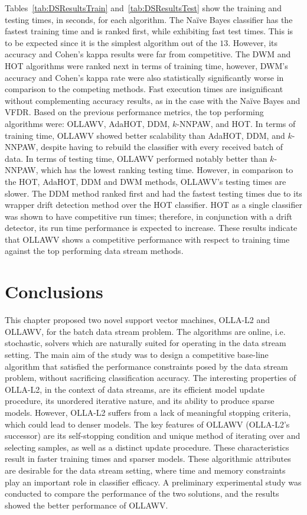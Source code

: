 \documentclass[reqno]{vcuthesis}
\numberwithin{equation}{chapter}
\begin{document}
Tables~\ref{tab:DSResultsTrain} and~\ref{tab:DSResultsTest} show the training and testing times, in seconds, for each algorithm. The Na\"ive Bayes classifier has the fastest training time and is ranked first, while exhibiting fast test times. This is to be expected since it is the simplest algorithm out of the $13$. However, its accuracy and Cohen's kappa results were far from competitive. The DWM and HOT algorithms were ranked next in terms of training time, however, DWM's accuracy and Cohen's kappa rate were also statistically significantly worse in comparison to the competing methods. Fast execution times are insignificant without complementing accuracy results, as in the case with the Na\"ive Bayes and VFDR. Based on the previous performance metrics, the top performing algorithms were: OLLAWV, AdaHOT, DDM, $k$-NNPAW, and HOT. In terms of training time, OLLAWV showed better scalability than AdaHOT, DDM, and $k$-NNPAW, despite having to rebuild the classifier with every received batch of data. In terms of testing time, OLLAWV performed notably better than $k$-NNPAW, which has the lowest ranking testing time. However, in comparison to the HOT, AdaHOT, DDM and DWM methods, OLLAWV's testing times are slower. The DDM method ranked first and had the fastest testing times due to its wrapper drift detection method over the HOT classifier. HOT as a single classifier was shown to have competitive run times; therefore, in conjunction with a drift detector, its run time performance is expected to increase. These results indicate that OLLAWV shows a competitive performance with respect to training time against the top performing data stream methods.

\section{Conclusions}
This chapter proposed two novel support vector machines, OLLA-L2 and OLLAWV, for the batch data stream problem. The algorithms are online, i.e. stochastic, solvers which are naturally suited for operating in the data stream setting. The main aim of the study was to design a competitive base-line algorithm that satisfied the performance constraints posed by the data stream problem, without sacrificing classification accuracy. The interesting properties of OLLA-L2, in the context of data streams, are its efficient model update procedure, its unordered iterative nature, and its ability to produce sparse models. However, OLLA-L2 suffers from a lack of meaningful stopping criteria, which could lead to denser models. The key features of OLLAWV (OLLA-L2's successor) are its self-stopping condition and unique method of iterating over and selecting samples, as well as a distinct update procedure. These characteristics result in faster training times and sparser models. These algorithmic attributes are desirable for the data stream setting, where time and memory constraints play an important role in classifier efficacy. A preliminary experimental study was conducted to compare the performance of the two solutions, and the results showed the better performance of OLLAWV.
\end{document}
